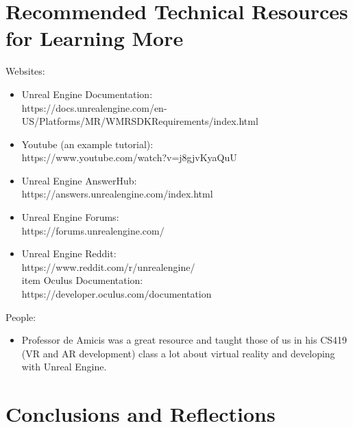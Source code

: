 \documentclass[onecolumn, draftclsnofoot,10pt, compsoc]{IEEEtran}
\begin{document}
\newpage
\section{Recommended Technical Resources for Learning More}


Websites:

\begin{itemize}
    \item Unreal Engine Documentation:
    \\https://docs.unrealengine.com/en-US/Platforms/MR/WMRSDKRequirements/index.html
    \item Youtube (an example tutorial):
    \\https://www.youtube.com/watch?v=j8gjvKyaQuU
    \item Unreal Engine AnswerHub:
    \\https://answers.unrealengine.com/index.html
    \item Unreal Engine Forums:
    \\https://forums.unrealengine.com/
    \item Unreal Engine Reddit:
    \\https://www.reddit.com/r/unrealengine/
    \\item Oculus Documentation:
    \\https://developer.oculus.com/documentation
\end{itemize}

People:

\begin{itemize}
    \item Professor de Amicis was a great resource and taught those of us in his CS419 (VR and AR development) class a lot about virtual reality and developing with Unreal Engine.
\end{itemize}

\section{Conclusions and Reflections}
\end{document}
